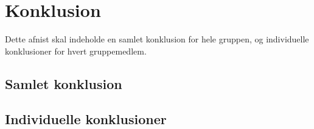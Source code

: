 \chapter{Konklusion}

Dette afnist skal indeholde en samlet konklusion for hele gruppen, og individuelle konklusioner for hvert gruppemedlem.

\section{Samlet konklusion}

\section{Individuelle konklusioner}